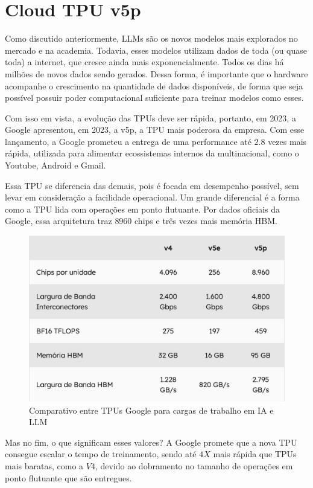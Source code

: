 \documentclass{report}
\begin{document}
\chapter{Cloud TPU v5p}

Como discutido anteriormente, LLMs são os novos modelos mais explorados no mercado e na academia. Todavia, esses modelos utilizam dados de toda (ou quase toda) a internet, que cresce ainda mais exponencialmente. Todos os dias há milhões de novos dados sendo gerados. Dessa forma, é importante que o hardware acompanhe o crescimento na quantidade de dados disponíveis, de forma que seja possível possuir poder computacional suficiente para treinar modelos como esses.

Com isso em vista, a evolução das TPUs deve ser rápida, portanto, em 2023, a Google apresentou, em 2023, a v5p, a TPU mais poderosa da empresa. Com esse lançamento, a Google prometeu a entrega de uma performance até $2.8$ vezes mais rápida, utilizada para alimentar ecossistemas internos da multinacional, como o Youtube, Android e Gmail.

Essa TPU se diferencia das demais, pois é focada em desempenho possível, sem levar em consideração a facilidade operacional. Um grande diferencial é a forma como a TPU lida com operações em ponto flutuante. Por dados oficiais da Google, essa arquitetura traz $8960$ chips e três vezes mais memória HBM.

\begin{figure}[h]
\includegraphics[scale=0.7]{comparativo-tpus}
\centering
\caption{Comparativo entre TPUs Google para cargas de trabalho em IA e LLM}
\end{figure}

Mas no fim, o que significam esses valores? A Google promete que a nova TPU consegue escalar o tempo de treinamento, sendo até $4X$ mais rápida que TPUs mais baratas, como a $V4$, devido ao dobramento no tamanho de operações em ponto flutuante que são entregues.
\end{document}
